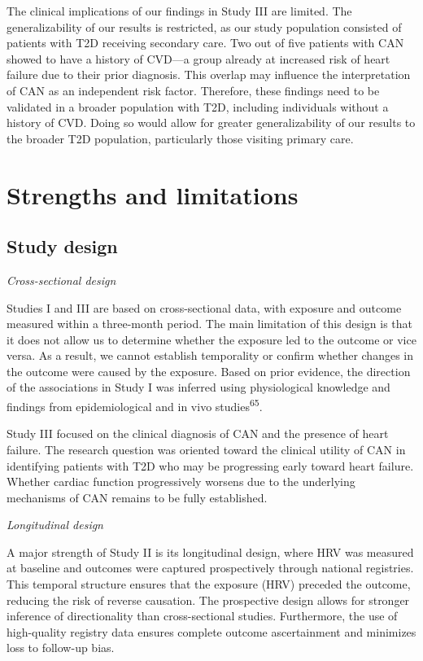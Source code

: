 \documentclass[
  a4paper,
  headsepline=true,
  open=any]{scrbook}
\begin{document}
The clinical implications of our findings in Study III are limited. The
generalizability of our results is restricted, as our study population
consisted of patients with T2D receiving secondary care. Two out of five
patients with CAN showed to have a history of CVD---a group already at
increased risk of heart failure due to their prior diagnosis. This
overlap may influence the interpretation of CAN as an independent risk
factor. Therefore, these findings need to be validated in a broader
population with T2D, including individuals without a history of CVD.
Doing so would allow for greater generalizability of our results to the
broader T2D population, particularly those visiting primary care.

\hypertarget{strengths-and-limitations}{%
\section{Strengths and limitations}\label{strengths-and-limitations}}

\hypertarget{study-design}{%
\subsection{Study design}\label{study-design}}

\emph{Cross-sectional design}

Studies I and III are based on cross-sectional data, with exposure and
outcome measured within a three-month period. The main limitation of
this design is that it does not allow us to determine whether the
exposure led to the outcome or vice versa. As a result, we cannot
establish temporality or confirm whether changes in the outcome were
caused by the exposure. Based on prior evidence, the direction of the
associations in Study I was inferred using physiological knowledge and
findings from epidemiological and in vivo studies\textsuperscript{65}.

Study III focused on the clinical diagnosis of CAN and the presence of
heart failure. The research question was oriented toward the clinical
utility of CAN in identifying patients with T2D who may be progressing
early toward heart failure. Whether cardiac function progressively
worsens due to the underlying mechanisms of CAN remains to be fully
established.

\emph{Longitudinal design}

A major strength of Study II is its longitudinal design, where HRV was
measured at baseline and outcomes were captured prospectively through
national registries. This temporal structure ensures that the exposure
(HRV) preceded the outcome, reducing the risk of reverse causation. The
prospective design allows for stronger inference of directionality than
cross-sectional studies. Furthermore, the use of high-quality registry
data ensures complete outcome ascertainment and minimizes loss to
follow-up bias.
\end{document}
